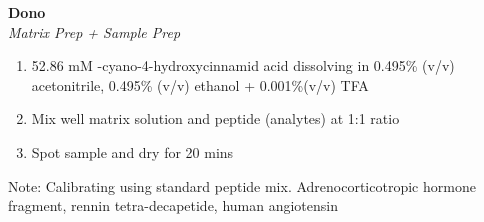 \textbf{Dono} 
\\
\textit{Matrix Prep + Sample Prep}
\begin{enumerate}
\item{52.86 mM \alpha-cyano-4-hydroxycinnamid acid dissolving in 0.495\% (v/v) acetonitrile, 0.495\% (v/v) ethanol + 0.001\%(v/v) TFA}
\item{Mix well matrix solution and peptide (analytes) at 1:1 ratio}
\item{Spot sample and dry for 20 mins}
\end{enumerate}
\footnotesize
Note: Calibrating using standard peptide mix. Adrenocorticotropic hormone fragment, rennin tetra-decapetide, human angiotensin 